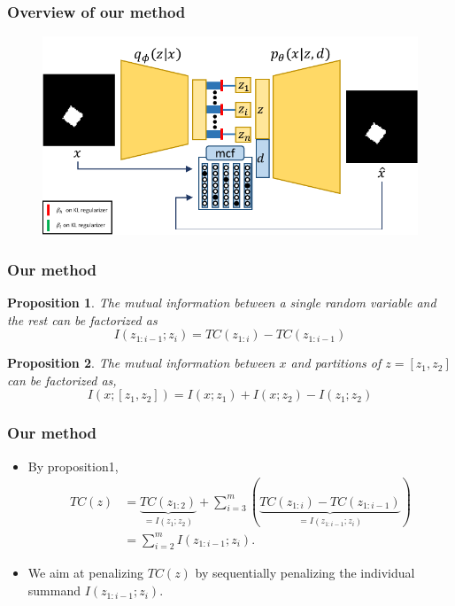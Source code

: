 \documentclass[10pt,mathserif]{beamer}
\newtheorem{prop}{Proposition}
\begin{document}
\begin{frame}
\frametitle{Overview of our method}
\begin{figure}
\includegraphics[page=2, width=\linewidth]{dis_asset/arch}
\end{figure}
\end{frame} 

\begin{frame}
\frametitle{Our method}
\begin{prop}
The mutual information between a single random variable and the rest can be factorized as
\[I(z_{1:i-1}; z_i) = TC(z_{1:i}) - TC(z_{1:i-1})\]
\end{prop}
\begin{prop}
The mutual information between $x$ and partitions of $z = [z_1, z_2]$ can be factorized as,
\[I(x; [z_1, z_2]) = I(x;z_1) + I(x; z_2) - I(z_1; z_2)\]
\end{prop}
\end{frame}

\begin{frame}
\frametitle{Our method}
\begin{itemize}\itemsep=12pt
\item By proposition1,
\begin{align}
TC(z)&=\underbrace{TC(z_{1:2})}_{= I(z_1; z_2)} + \sum_{i=3}^m \left( \underbrace{TC(z_{1:i}) - TC(z_{1:i-1})}_{= I(z_{1:i-1}; z_i)} \right)\nonumber\\
&= \sum_{i=2}^m I(z_{1:i-1}; z_i).\nonumber
\end{align}
\pause
\item We aim at penalizing $TC(z)$ by sequentially penalizing the individual summand $I(z_{1:i-1};z_i)$.
\end{itemize}
\end{frame}
\end{document}
